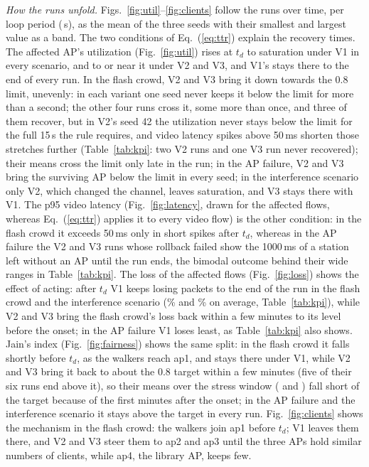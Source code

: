 \documentclass[conference]{IEEEtran}
\begin{document}
\emph{How the runs unfold.} Figs.~\ref{fig:util}--\ref{fig:clients} follow the runs over time, per loop period (\CfgPeriod\,s), as the mean of the three seeds with their smallest and largest value as a band. The two conditions of Eq.~(\ref{eq:ttr}) explain the recovery times. The affected AP's utilization (Fig.~\ref{fig:util}) rises at $t_d$ to saturation under V1 in every scenario, and to or near it under V2 and V3, and V1's stays there to the end of every run. In the flash crowd, V2 and V3 bring it down towards the 0.8 limit, unevenly: in each variant one seed never keeps it below the limit for more than a second; the other four runs cross it, some more than once, and three of them recover, but in V2's seed 42 the utilization never stays below the limit for the full 15\,s the rule requires, and video latency spikes above 50\,ms shorten those stretches further (Table~\ref{tab:kpi}: two V2 runs and one V3 run never recovered); their means cross the limit only late in the run; in the AP failure, V2 and V3 bring the surviving AP below the limit in every seed; in the interference scenario only V2, which changed the channel, leaves saturation, and V3 stays there with V1. The p95 video latency (Fig.~\ref{fig:latency}, drawn for the affected flows, whereas Eq.~(\ref{eq:ttr}) applies it to every video flow) is the other condition: in the flash crowd it exceeds 50\,ms only in short spikes after $t_d$, whereas in the AP failure the V2 and V3 runs whose rollback failed show the 1000\,ms of a station left without an AP until the run ends, the bimodal outcome behind their wide ranges in Table~\ref{tab:kpi}. The loss of the affected flows (Fig.~\ref{fig:loss}) shows the effect of acting: after $t_d$ V1 keeps losing packets to the end of the run in the flash crowd and the interference scenario (\KpiFlashLossVone\% and \KpiCochanLossVone\% on average, Table~\ref{tab:kpi}), while V2 and V3 bring the flash crowd's loss back within a few minutes to its level before the onset; in the AP failure V1 loses least, as Table~\ref{tab:kpi} also shows. Jain's index (Fig.~\ref{fig:fairness}) shows the same split: in the flash crowd it falls shortly before $t_d$, as the walkers reach ap1, and stays there under V1, while V2 and V3 bring it back to about the 0.8 target within a few minutes (five of their six runs end above it), so their means over the stress window (\FairJainVtwo{} and \FairJainVthree) fall short of the target because of the first minutes after the onset; in the AP failure and the interference scenario it stays above the target in every run. Fig.~\ref{fig:clients} shows the mechanism in the flash crowd: the walkers join ap1 before $t_d$; V1 leaves them there, and V2 and V3 steer them to ap2 and ap3 until the three APs hold similar numbers of clients, while ap4, the library AP, keeps few.
\end{document}
